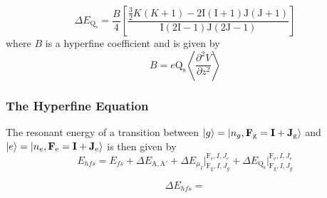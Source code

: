 \documentclass[12pt,a4paper,margin=1in]{book}
\begin{document}
\begin{equation}
\Delta E_{\mathrm{Q_s}} = \frac{B}{4}\left[\frac{\frac{3}{2}K(K+1)-2\mathrm{I}(\mathrm{I}+1)\mathrm{J}(\mathrm{J}+1)}{\mathrm{I}(2\mathrm{I}-1)\mathrm{J}(2\mathrm{J}-1)}\right]
\end{equation}
where $B$ is a hyperfine coefficient and is given by
\begin{equation}
B = e\mathrm{Q_s}\left\langle\frac{\partial^2V}{\partial z^2} \right\rangle
\end{equation}

\subsubsection*{The Hyperfine Equation}
The resonant energy of a transition between $\ket{g}=\ket{n_g,\mathrm{\textbf{F}_g=\textbf{I} + \textbf{J}_g}}$ and $\ket{e}=\ket{n_e,\mathrm{\textbf{F}_e=\textbf{I} + \textbf{J}_e}}$ is then given by
\begin{equation}
E_{hfs} = E_{fs} +  \Delta E_{\mathrm{A,A'}}+\Delta E_{\mu_I}\Bigr|_{\mathrm{F_g},I,J_g}^{\mathrm{F_e},I,J_e}+\Delta E_{\mathrm{Q_s}}\Bigr|_{\mathrm{F_g},I,J_g}^{\mathrm{F_e},I,J_e}
\end{equation}

\begin{equation}
\Delta E_{hfs} = 
\end{equation}
\end{document}
